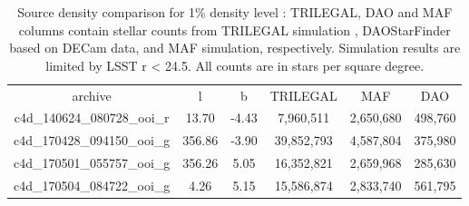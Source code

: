 \documentclass[DM,lsstdraft,toc,usenatbib]{lsstdoc}
\begin{document}

\begin{table}
\begin{tabular}{cccccc}
archive & l & b & TRILEGAL & MAF & DAO \\
c4d\_140624\_080728\_ooi\_r & 13.70 & -4.43 & 7,960,511 & 2,650,680 & 498,760 \\
c4d\_170428\_094150\_ooi\_g & 356.86 & -3.90 & 39,852,793 & 4,587,804 & 375,980 \\
c4d\_170501\_055757\_ooi\_g & 356.26 & 5.05 & 16,352,821 & 2,659,968 & 285,630 \\
c4d\_170504\_084722\_ooi\_g & 4.26 & 5.15 & 15,586,874 & 2,833,740 & 561,795 \\
\end{tabular}
\caption{Source density comparison for 1\% density level : TRILEGAL, DAO and MAF columns contain stellar counts from TRILEGAL simulation , DAOStarFinder based on DECam data, and MAF simulation, respectively. Simulation results are  limited by LSST r < 24.5. All counts are in stars per square degree. }
\label{tab:one_perc}
\end{table}
 
\end{document}
